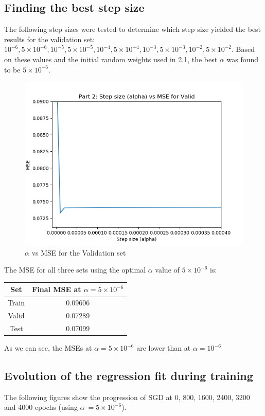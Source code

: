\documentclass[paper=a4, fontsize=11pt]{scrartcl} %
\numberwithin{equation}{section} %
\numberwithin{figure}{section} %
\numberwithin{table}{section} %
\begin{document}
\subsection{Finding the best step size}
The following step sizes were tested to determine which step size yielded the best results for the validation set:  \(10^{-6}, 5\times10^{-6}, 10^{-5}, 5\times10^{-5}, 10^{-4}, 5\times10^{-4}, 10^{-3}, 5\times10^{-3}, 10^{-2}, 5\times10^{-2}\). Based on these values and the initial random weights used in 2.1, the best \(\alpha\) was found to be \(5\times10^{-6}\).

\begin{figure}[H]
    \includegraphics[width=\linewidth]{q2p2.png}
    \caption{\(\alpha\) vs MSE for the Validation set}
    \label{fig:q2p2}
\end{figure}

The MSE for all three sets using the optimal \(\alpha\) value of \(5\times10^{-6}\) is:
\begin{center}
\begin{tabular}{ |c|c| }
	\hline
	\textbf{Set} & \textbf{Final MSE at \(\alpha = 5\times10^{-6}\)} \\
	\hline
    Train &  0.09606 \\
	Valid & 0.07289 \\
	Test & 0.07099 \\
	\hline
\end{tabular}
\end{center}
As we can see, the MSEs at \(\alpha = 5\times10^{-6}\) are lower than at  \(\alpha = 10^{-6}\)

\subsection{Evolution of the regression fit during training}
The following figures show the progression of SGD at 0, 800, 1600, 2400, 3200 and 4000 epochs (using \(\alpha\ = 5\times10^{-6}\)).
\end{document}

